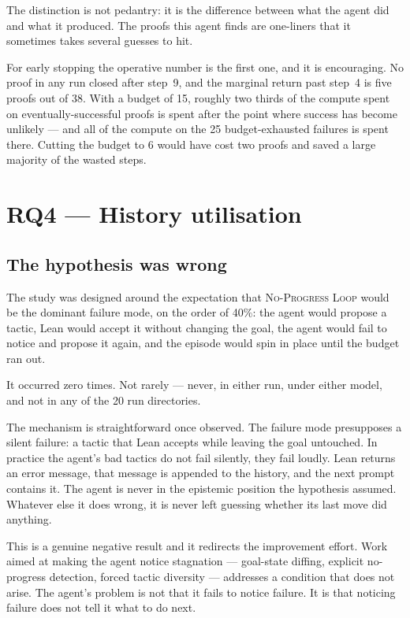 The distinction is not pedantry: it is the difference between what the agent did
and what it produced. The proofs this agent finds are one-liners that it
sometimes takes several guesses to hit.

For early stopping the operative number is the first one, and it is encouraging.
No proof in any run closed after step~9, and the marginal return past step~4 is
five proofs out of 38. With a budget of 15, roughly two thirds of the compute
spent on eventually-successful proofs is spent after the point where success has
become unlikely --- and all of the compute on the 25 budget-exhausted failures is
spent there. Cutting the budget to 6 would have cost two proofs and saved a
large majority of the wasted steps.

\section{RQ4 --- History utilisation}
\label{sec:results_rq4}

\subsection{The hypothesis was wrong}

The study was designed around the expectation that \textsc{No-Progress Loop}
would be the dominant failure mode, on the order of 40\%: the agent would propose
a tactic, Lean would accept it without changing the goal, the agent would fail to
notice and propose it again, and the episode would spin in place until the budget
ran out.

It occurred zero times. Not rarely --- never, in either run, under either model,
and not in any of the 20 run directories.

The mechanism is straightforward once observed. The failure mode presupposes a
silent failure: a tactic that Lean accepts while leaving the goal untouched.
In practice the agent's bad tactics do not fail silently, they fail loudly.
Lean returns an error message, that message is appended to the history, and the
next prompt contains it. The agent is never in the epistemic position the
hypothesis assumed. Whatever else it does wrong, it is never left guessing
whether its last move did anything.

This is a genuine negative result and it redirects the improvement effort.
Work aimed at making the agent notice stagnation --- goal-state diffing,
explicit no-progress detection, forced tactic diversity --- addresses a condition
that does not arise. The agent's problem is not that it fails to notice failure.
It is that noticing failure does not tell it what to do next.

